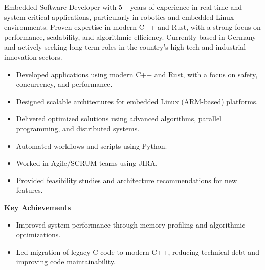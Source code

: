 \documentclass[10pt,a4paper,ragged2e,withhyper]{altacv}
\begin{document}
\begin{paracol}{2}


	{\small
	Embedded Software Developer with 5+ years of experience in real-time and system-critical applications,
	particularly in robotics and embedded Linux environments. Proven expertise in modern C++ and Rust, with a
	strong focus on performance, scalability, and algorithmic efficiency. Currently based in Germany and actively
	seeking long-term roles in the country’s high-tech and industrial innovation sectors.
	}


	\begin{itemize}
		\item Developed applications using modern C++ and Rust, with a focus on safety, concurrency, and performance.
		\item Designed scalable architectures for embedded Linux (ARM-based) platforms.
		\item Delivered optimized solutions using advanced algorithms, parallel programming, and distributed systems.
		\item Automated workflows and scripts using Python.
		\item Worked in Agile/SCRUM teams using JIRA.
		\item Provided feasibility studies and architecture recommendations for new features.
	\end{itemize}

	\vspace{0.5em}
	{\color{accent}\textbf{\large Key Achievements}}
	\vspace{0.3em}
	\begin{itemize}
		\item Improved system performance through memory profiling and algorithmic optimizations.
		\item Led migration of legacy C code to modern C++, reducing technical debt and improving code maintainability.
	\end{itemize}

	\divider


\end{paracol}
\end{document}
